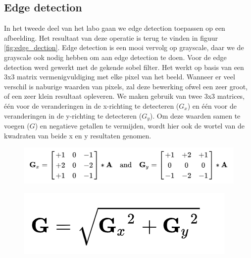 \documentclass[11pt,twoside,a4paper]{article}
\begin{document}
\subsection{Edge detection}

In het tweede deel van het labo gaan we edge detection toepassen op een afbeelding. Het resultaat van deze operatie is terug te vinden in figuur \ref{fig:edge_dection}. Edge detection is een mooi vervolg op grayscale, daar we de grayscale ook nodig hebben om aan edge detection te doen. Voor de edge detection werd gewerkt met de gekende sobel filter. Het werkt op basis van een 3x3 matrix vermenigvuldiging met elke pixel van het beeld. Wanneer er veel verschil is naburige waarden van pixels, zal deze bewerking ofwel een zeer groot, of een zeer klein resultaat opleveren. We maken gebruik van twee 3x3 matrices, \'e\'en voor de veranderingen in de x-richting te detecteren ($G_x$) en \'e\'en voor de veranderingen in de y-richting te detecteren ($G_y$). Om deze waarden samen te voegen ($G$) en negatieve getallen te vermijden, wordt hier ook de wortel van de kwadraten van beide x en y resultaten genomen.

\begin{figure}[H]
    \centering
    \includegraphics[scale=0.3]{1.png}
    \caption*{}
    \label{fig:formule1}
\end{figure}

\begin{figure}[H]
    \centering
    \includegraphics[scale=0.3]{2.png}
    \caption*{\cite{sobel}}
    \label{fig:formule2}
\end{figure}
\end{document}
